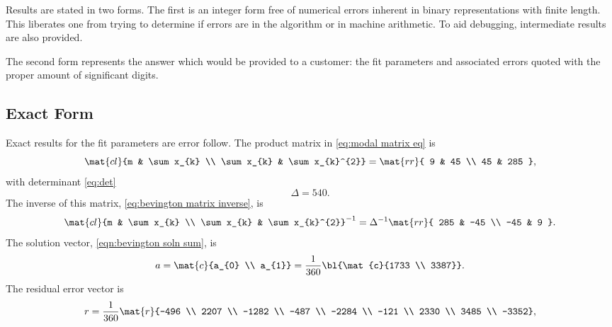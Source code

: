 Results are stated in two forms. The first is an integer form free of numerical errors inherent in binary representations with finite length. This liberates one from trying to determine if errors are in the algorithm or in machine arithmetic. To aid debugging, intermediate results are also provided.

The second form represents the answer which would be provided to a customer: the fit parameters and associated errors quoted with the proper amount of significant digits.
 
\subsection{\label{sec:exact form}Exact Form}  %
Exact results for the fit parameters are error follow. The product matrix in \eqref{eq:modal matrix eq} is 
  \begin{equation*}   %
    \mat{cl}{m & \sum x_{k} \\ \sum x_{k} & \sum x_{k}^{2}} = \mat{rr}{ 9 & 45 \\ 45 & 285 },
  \end{equation*}
with determinant \eqref{eq:det}
  \begin{equation*}   %
    \Delta =  540.
  \end{equation*}
The inverse of this matrix, \eqref{eq:bevington matrix inverse}, is
  \begin{equation*}   %
    \mat{cl}{m & \sum x_{k} \\ \sum x_{k} & \sum x_{k}^{2}} ^{-1} = \Delta^{-1} \mat{rr}{ 285 & -45 \\ -45 & 9 }.
  \end{equation*}
The solution vector, \eqref{eqn:bevington soln sum}, is
  \begin{equation*}   %
      a = \mat{c}{a_{0} \\ a_{1}} = \frac{1}{360} \bl{\mat{c}{1733 \\ 3387}}.
  \end{equation*}
The residual error vector is 
  \begin{equation*}
        r = \frac{1}{360}
          \mat{r}{-496 \\ 2207 \\ -1282 \\ -487 \\ -2284 \\ -121 \\ 2330 \\ 3485 \\ -3352},
  \end{equation*}

